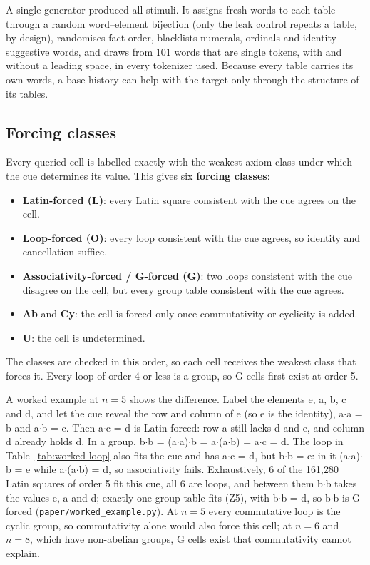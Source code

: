 \documentclass[11pt]{article}
\begin{document}
A single generator produced all stimuli. It assigns fresh words to each table through a random word--element bijection (only the leak control repeats a table, by design), randomises fact order, blacklists numerals, ordinals and identity-suggestive words, and draws from 101 words that are single tokens, with and without a leading space, in every tokenizer used. Because every table carries its own words, a base history can help with the target only through the structure of its tables.

\subsection{Forcing classes}\label{sec:classes}

Every queried cell is labelled exactly with the weakest axiom class under which the cue determines its value. This gives six \textbf{forcing classes}:

\begin{itemize}
  \item \textbf{Latin-forced (L)}: every Latin square consistent with the cue agrees on the cell.
  \item \textbf{Loop-forced (O)}: every loop consistent with the cue agrees, so identity and cancellation suffice.
  \item \textbf{Associativity-forced / G-forced (G)}: two loops consistent with the cue disagree on the cell, but every group table consistent with the cue agrees.
  \item \textbf{Ab} and \textbf{Cy}: the cell is forced only once commutativity or cyclicity is added.
  \item \textbf{U}: the cell is undetermined.
\end{itemize}

The classes are checked in this order, so each cell receives the weakest class that forces it. Every loop of order 4 or less is a group, so G cells first exist at order 5.

A worked example at $n = 5$ shows the difference. Label the elements e, a, b, c and d, and let the cue reveal the row and column of e (so e is the identity), a$\cdot$a = b and a$\cdot$b = c. Then a$\cdot$c = d is Latin-forced: row a still lacks d and e, and column d already holds d. In a group, b$\cdot$b = (a$\cdot$a)$\cdot$b = a$\cdot$(a$\cdot$b) = a$\cdot$c = d. The loop in Table~\ref{tab:worked-loop} also fits the cue and has a$\cdot$c = d, but b$\cdot$b = e: in it (a$\cdot$a)$\cdot$b = e while a$\cdot$(a$\cdot$b) = d, so associativity fails. Exhaustively, 6 of the 161,280 Latin squares of order 5 fit this cue, all 6 are loops, and between them b$\cdot$b takes the values e, a and d; exactly one group table fits (Z5), with b$\cdot$b = d, so b$\cdot$b is G-forced (\texttt{paper/\allowbreak{}worked\_example.py}). At $n = 5$ every commutative loop is the cyclic group, so commutativity alone would also force this cell; at $n = 6$ and $n = 8$, which have non-abelian groups, G cells exist that commutativity cannot explain.
\end{document}
